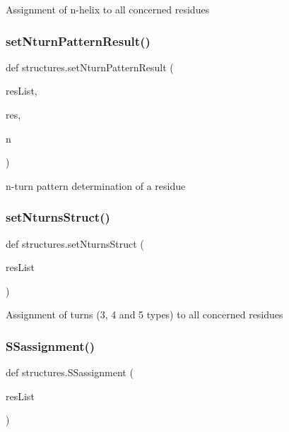 \begin{DoxyVerb}Assignment of n-helix to all concerned residues\end{DoxyVerb}
 \mbox{\label{namespacestructures_a9515a253ddfcce61aec69e51b0f1724f}} 
\subsubsection{\texorpdfstring{set\+Nturn\+Pattern\+Result()}{setNturnPatternResult()}}
{\footnotesize\ttfamily def structures.\+set\+Nturn\+Pattern\+Result (\begin{DoxyParamCaption}\item[{}]{res\+List,  }\item[{}]{res,  }\item[{}]{n }\end{DoxyParamCaption})}

\begin{DoxyVerb}n-turn pattern determination of a residue\end{DoxyVerb}
 \mbox{\label{namespacestructures_a0a358ea8e3f30f480a6a6dfd7e020a2d}} 
\subsubsection{\texorpdfstring{set\+Nturns\+Struct()}{setNturnsStruct()}}
{\footnotesize\ttfamily def structures.\+set\+Nturns\+Struct (\begin{DoxyParamCaption}\item[{}]{res\+List }\end{DoxyParamCaption})}

\begin{DoxyVerb}Assignment of turns (3, 4 and 5 types) to all concerned residues\end{DoxyVerb}
 \mbox{\label{namespacestructures_a6bab85ee160c457a0b2f01456b617326}} 
\subsubsection{\texorpdfstring{S\+Sassignment()}{SSassignment()}}
{\footnotesize\ttfamily def structures.\+S\+Sassignment (\begin{DoxyParamCaption}\item[{}]{res\+List }\end{DoxyParamCaption})}



